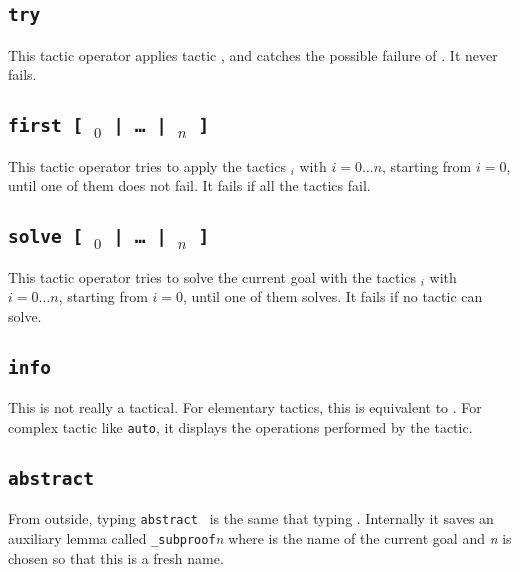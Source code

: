 \subsection{\tt try {\tac}}
This tactic operator applies tactic \tac, and catches the possible
failure of \tac. It never fails.

\subsection{\tt first [ \tac$_0$ | \dots\ | \tac$_n$ ]}

This tactic operator tries to apply the tactics \tac$_i$ with $i=0\ldots{}n$,
starting from $i=0$, until one of them does not fail. It fails if all the
tactics fail.

\begin{ErrMsgs}
\item {}
\end{ErrMsgs}

\subsection{\tt solve [ \tac$_0$ | \dots\ | \tac$_n$ ]}

This tactic operator tries to solve the current goal with the tactics \tac$_i$
with $i=0\ldots{}n$, starting from $i=0$, until one of them solves. It fails if
no tactic can solve.

\begin{ErrMsgs}
\item {}
\end{ErrMsgs}

\subsection{\tt info {\tac}}
This is not really a tactical. For elementary tactics, this is
equivalent to \tac. For complex tactic like \texttt{auto}, it displays
the operations performed by the tactic.

\subsection{\tt abstract {\tac}}
From outside, typing \texttt{abstract \tac} is the same that
typing \tac. Internally it saves an auxiliary lemma called 
{\ident}\texttt{\_subproof}\textit{n} where {\ident} is the name of the
current goal and \textit{n} is chosen so that this is a fresh name.

